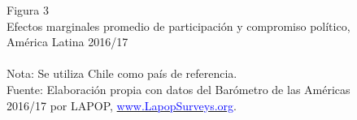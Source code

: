 \documentclass[a4paper]{tufte-handout}
\begin{document}
\begin{figure}[h!]
\captionsetup[subfigure]{labelformat=empty}
  \centering
  \smallskip\noindent\small Figura 3 \\ Efectos marginales promedio de participación y compromiso político, América Latina 2016/17
  \\
  \\ \smallskip\noindent\scriptsize Nota: Se utiliza Chile como país de referencia. \\ Fuente: Elaboración propia con datos del Barómetro de las Américas 2016/17 por LAPOP, \href{https://www.vanderbilt.edu/lapop/}{\textcolor{blue}{www.LapopSurveys.org}}.
\end{figure}
\end{document}
